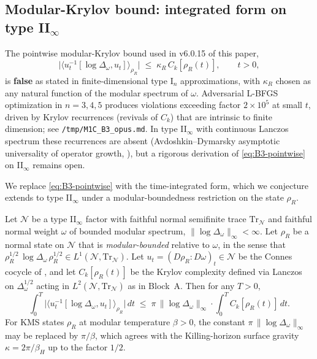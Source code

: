 
\subsection{Modular-Krylov bound: integrated form on type II$_\infty$}
\label{sec:M1C-integrated}

The pointwise modular-Krylov bound used in v6.0.15 of this paper,
\begin{equation}
  \big|\langle u_t^{-1}[\log\Delta_\omega, u_t]\rangle_{\rho_R}\big|
  \;\le\;
  \kappa_R\, C_k[\rho_R(t)],
  \qquad t > 0,
  \label{eq:B3-pointwise}
\end{equation}
is \textbf{false} as stated in finite-dimensional type I$_n$ approximations, with $\kappa_R$ chosen as any natural function of the modular spectrum of $\omega$.  Adversarial L-BFGS optimization in $n=3,4,5$ produces violations exceeding factor $2\times 10^5$ at small $t$, driven by Krylov recurrences (revivals of $C_k$) that are intrinsic to finite dimension; see \texttt{/tmp/M1C\_B3\_opus.md}.  In type II$_\infty$ with continuous Lanczos spectrum these recurrences are absent (Avdoshkin--Dymarsky asymptotic universality of operator growth, \cite{AvdoshkinDymarsky2019}), but a rigorous derivation of \eqref{eq:B3-pointwise} on II$_\infty$ remains open.

We replace \eqref{eq:B3-pointwise} with the time-integrated form, which we conjecture extends to type II$_\infty$ under a modular-boundedness restriction on the state $\rho_R$.

\begin{conjecture}
\label{conj:M1C-integrated}
Let $\mathcal{N}$ be a type II$_\infty$ factor with faithful normal semifinite trace $\mathrm{Tr}_{\mathcal{N}}$ and faithful normal weight $\omega$ of bounded modular spectrum, $\|\log\Delta_\omega\|_\infty < \infty$.  Let $\rho_R$ be a normal state on $\mathcal{N}$ that is \emph{modular-bounded} relative to $\omega$, in the sense that $\rho_R^{1/2}\,\log\Delta_\omega\,\rho_R^{1/2} \in L^1(\mathcal{N}, \mathrm{Tr}_{\mathcal{N}})$.  Let $u_t = (D\rho_R : D\omega)_t \in \mathcal{N}$ be the Connes cocycle of \cite{ConnesTakesaki1977}, and let $C_k[\rho_R(t)]$ be the Krylov complexity defined via Lanczos on $\Delta_\omega^{1/2}$ acting in $L^2(\mathcal{N}, \mathrm{Tr}_{\mathcal{N}})$ as in Block~A.  Then for any $T > 0$,
\begin{equation}
  \int_0^T \big|\langle u_t^{-1}[\log\Delta_\omega, u_t]\rangle_{\rho_R}\big|\, dt
  \;\le\;
  \pi\,\|\log\Delta_\omega\|_\infty \cdot \int_0^T C_k[\rho_R(t)]\, dt.
  \label{eq:B3-integrated}
\end{equation}
For KMS states $\rho_R$ at modular temperature $\beta > 0$, the constant $\pi\,\|\log\Delta_\omega\|_\infty$ may be replaced by $\pi/\beta$, which agrees with the Killing-horizon surface gravity $\kappa = 2\pi/\beta_H$ up to the factor $1/2$.
\end{conjecture}

